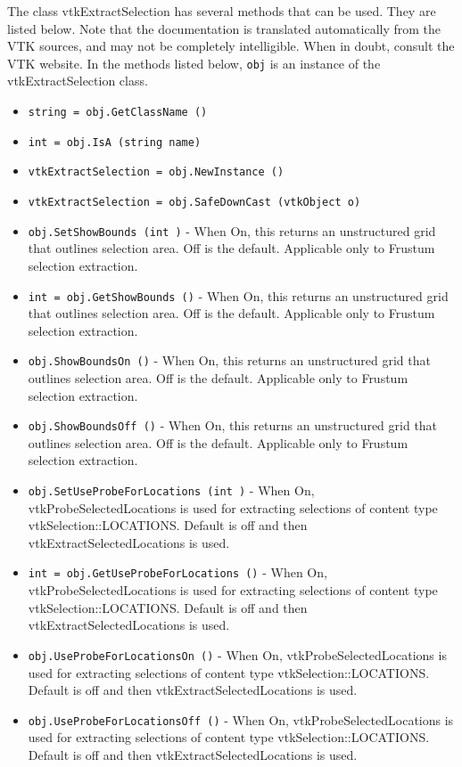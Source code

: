The class vtkExtractSelection has several methods that can be used.
  They are listed below.
Note that the documentation is translated automatically from the VTK sources,
and may not be completely intelligible.  When in doubt, consult the VTK website.
In the methods listed below, \verb|obj| is an instance of the vtkExtractSelection class.
\begin{itemize}
\item  \verb|string = obj.GetClassName ()|

\item  \verb|int = obj.IsA (string name)|

\item  \verb|vtkExtractSelection = obj.NewInstance ()|

\item  \verb|vtkExtractSelection = obj.SafeDownCast (vtkObject o)|

\item  \verb|obj.SetShowBounds (int )| -  When On, this returns an unstructured grid that outlines selection area.
 Off is the default. Applicable only to Frustum selection extraction.

\item  \verb|int = obj.GetShowBounds ()| -  When On, this returns an unstructured grid that outlines selection area.
 Off is the default. Applicable only to Frustum selection extraction.

\item  \verb|obj.ShowBoundsOn ()| -  When On, this returns an unstructured grid that outlines selection area.
 Off is the default. Applicable only to Frustum selection extraction.

\item  \verb|obj.ShowBoundsOff ()| -  When On, this returns an unstructured grid that outlines selection area.
 Off is the default. Applicable only to Frustum selection extraction.

\item  \verb|obj.SetUseProbeForLocations (int )| -  When On, vtkProbeSelectedLocations is used for extracting selections of
 content type vtkSelection::LOCATIONS. Default is off and then
 vtkExtractSelectedLocations is used.

\item  \verb|int = obj.GetUseProbeForLocations ()| -  When On, vtkProbeSelectedLocations is used for extracting selections of
 content type vtkSelection::LOCATIONS. Default is off and then
 vtkExtractSelectedLocations is used.

\item  \verb|obj.UseProbeForLocationsOn ()| -  When On, vtkProbeSelectedLocations is used for extracting selections of
 content type vtkSelection::LOCATIONS. Default is off and then
 vtkExtractSelectedLocations is used.

\item  \verb|obj.UseProbeForLocationsOff ()| -  When On, vtkProbeSelectedLocations is used for extracting selections of
 content type vtkSelection::LOCATIONS. Default is off and then
 vtkExtractSelectedLocations is used.

\end{itemize}

